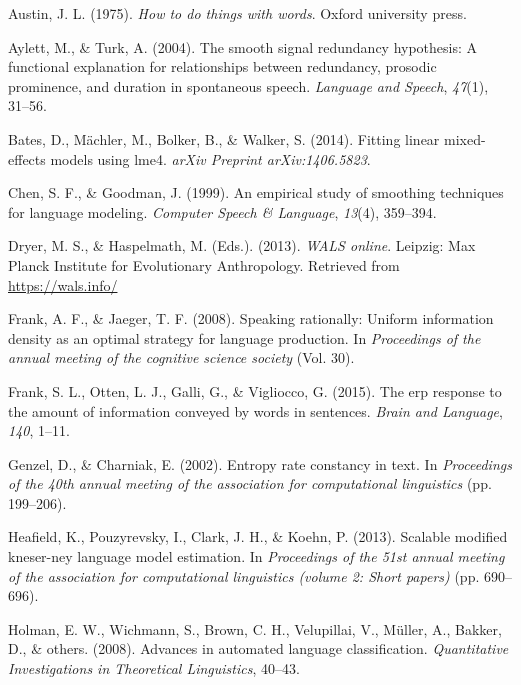 \documentclass[man,floatsintext]{apa6}
\begin{document}
\leavevmode\hypertarget{ref-austin1975}{}%
Austin, J. L. (1975). \emph{How to do things with words}. Oxford university press.

\leavevmode\hypertarget{ref-aylett2004}{}%
Aylett, M., \& Turk, A. (2004). The smooth signal redundancy hypothesis: A functional explanation for relationships between redundancy, prosodic prominence, and duration in spontaneous speech. \emph{Language and Speech}, \emph{47}(1), 31--56.

\leavevmode\hypertarget{ref-bates2014}{}%
Bates, D., Mächler, M., Bolker, B., \& Walker, S. (2014). Fitting linear mixed-effects models using lme4. \emph{arXiv Preprint arXiv:1406.5823}.

\leavevmode\hypertarget{ref-chen1999}{}%
Chen, S. F., \& Goodman, J. (1999). An empirical study of smoothing techniques for language modeling. \emph{Computer Speech \& Language}, \emph{13}(4), 359--394.

\leavevmode\hypertarget{ref-wals}{}%
Dryer, M. S., \& Haspelmath, M. (Eds.). (2013). \emph{WALS online}. Leipzig: Max Planck Institute for Evolutionary Anthropology. Retrieved from \url{https://wals.info/}

\leavevmode\hypertarget{ref-frank2008}{}%
Frank, A. F., \& Jaeger, T. F. (2008). Speaking rationally: Uniform information density as an optimal strategy for language production. In \emph{Proceedings of the annual meeting of the cognitive science society} (Vol. 30).

\leavevmode\hypertarget{ref-frank2015}{}%
Frank, S. L., Otten, L. J., Galli, G., \& Vigliocco, G. (2015). The erp response to the amount of information conveyed by words in sentences. \emph{Brain and Language}, \emph{140}, 1--11.

\leavevmode\hypertarget{ref-genzel2002}{}%
Genzel, D., \& Charniak, E. (2002). Entropy rate constancy in text. In \emph{Proceedings of the 40th annual meeting of the association for computational linguistics} (pp. 199--206).

\leavevmode\hypertarget{ref-heafield2013}{}%
Heafield, K., Pouzyrevsky, I., Clark, J. H., \& Koehn, P. (2013). Scalable modified kneser-ney language model estimation. In \emph{Proceedings of the 51st annual meeting of the association for computational linguistics (volume 2: Short papers)} (pp. 690--696).

\leavevmode\hypertarget{ref-holman2008}{}%
Holman, E. W., Wichmann, S., Brown, C. H., Velupillai, V., Müller, A., Bakker, D., \& others. (2008). Advances in automated language classification. \emph{Quantitative Investigations in Theoretical Linguistics}, 40--43.
\end{document}
